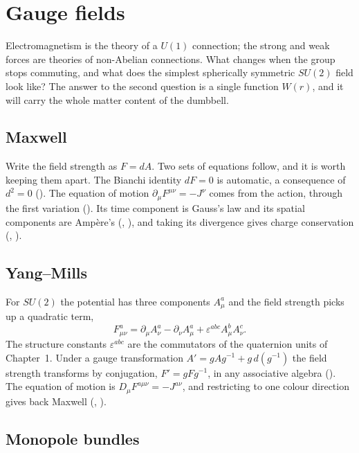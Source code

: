 \chapter{Gauge fields}\label{ch:gauge}

\begin{questionbox}
Electromagnetism is the theory of a $U(1)$ connection; the strong and weak forces are theories of non-Abelian connections. What changes when the group stops commuting, and what does the simplest spherically symmetric $SU(2)$ field look like? The answer to the second question is a single function $W(r)$, and it will carry the whole matter content of the dumbbell.
\end{questionbox}

\section{Maxwell}

Write the field strength as $F=dA$. Two sets of equations follow, and it is worth keeping them apart. The Bianchi identity $dF=0$ is automatic, a consequence of $d^2=0$ (). The equation of motion $\partial_\mu F^{\mu\nu}=-J^\nu$ comes from the action, through the first variation (). Its time component is Gauss's law and its spatial components are Amp\`ere's (, ), and taking its divergence gives charge conservation (, ).

\section{Yang--Mills}

For $SU(2)$ the potential has three components $A^a_\mu$ and the field strength picks up a quadratic term,
\[
F^a_{\mu\nu}=\partial_\mu A^a_\nu-\partial_\nu A^a_\mu+\varepsilon^{abc}A^b_\mu A^c_\nu .
\]
The structure constants $\varepsilon^{abc}$ are the commutators of the quaternion units of Chapter~1. Under a gauge transformation $A'=gAg^{-1}+g\,d(g^{-1})$ the field strength transforms by conjugation, $F'=gFg^{-1}$, in any associative algebra (). The equation of motion is $D_\mu F^{a\mu\nu}=-J^{a\nu}$, and restricting to one colour direction gives back Maxwell (, ).

\section{Monopole bundles}

